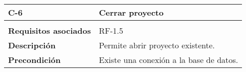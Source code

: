 \begin{longtable}[H]{@{}ll@{}}
\toprule
\begin{minipage}[b]{0.23\columnwidth}\raggedright\strut
\textbf{C-6}\strut
\end{minipage} & \begin{minipage}[b]{0.71\columnwidth}\raggedright\strut
\textbf{Cerrar proyecto}\strut
\end{minipage}\tabularnewline
\midrule
\endhead
\tabularnewline
\begin{minipage}[t]{0.23\columnwidth}\raggedright\strut
\textbf{Requisitos asociados}\strut
\end{minipage} & \begin{minipage}[t]{0.71\columnwidth}\raggedright\strut
RF-1.5\strut
\end{minipage}\tabularnewline
\begin{minipage}[t]{0.23\columnwidth}\raggedright\strut
\textbf{Descripción}\strut
\end{minipage} & \begin{minipage}[t]{0.71\columnwidth}\raggedright\strut
Permite abrir proyecto existente.\strut
\end{minipage}\tabularnewline
\begin{minipage}[t]{0.23\columnwidth}\raggedright\strut
\textbf{Precondición}\strut
\end{minipage} & \begin{minipage}[t]{0.71\columnwidth}\raggedright\strut
Existe una conexión a la base de datos.


\end{minipage}
\end{longtable}
